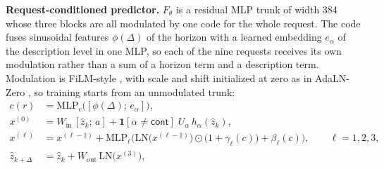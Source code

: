 \textbf{Request-conditioned predictor.} $F_\theta$ is a residual MLP trunk of width 384 whose three blocks are all modulated by one code for the whole request. The code fuses sinusoidal features $\phi(\Delta)$ of the horizon with a learned embedding $e_\alpha$ of the description level in one MLP, so each of the nine requests receives its own modulation rather than a sum of a horizon term and a description term. Modulation is FiLM-style \citep{perez2018film}, with scale and shift initialized at zero as in AdaLN-Zero \citep{peebles2023scalable}, so training starts from an unmodulated trunk:
\begin{align}
c(r)&=\mathrm{MLP}_c\big([\phi(\Delta);\,e_\alpha]\big),
\label{eq:code}\\
x^{(0)}&=W_{\mathrm{in}}\,[\hat z_k;\,a]+\mathbf{1}[\alpha\neq\textsf{cont}]\;U_\alpha\,h_\alpha(\hat z_k),
\label{eq:input}\\
x^{(\ell)}&=x^{(\ell-1)}+\mathrm{MLP}_\ell\Big(\mathrm{LN}\big(x^{(\ell-1)}\big)\odot\big(1+\gamma_\ell(c)\big)+\beta_\ell(c)\Big),\qquad \ell=1,2,3,
\label{eq:film}\\
\hat z_{k+\Delta}&=\hat z_k+W_{\mathrm{out}}\,\mathrm{LN}\big(x^{(3)}\big),
\label{eq:residual}
\end{align}
